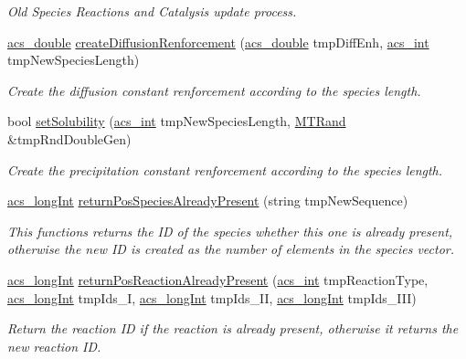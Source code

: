 \begin{DoxyCompactItemize}
\begin{DoxyCompactList}\small\item\em Old Species Reactions and Catalysis update process. \end{DoxyCompactList}\item 
\hyperlink{a00024_ab776853a005fcbf56af0424a2a4dd607}{acs\-\_\-double} \hyperlink{a00011_af795a4d1f04dfbfcbdf321e20e74f9c2}{create\-Diffusion\-Renforcement} (\hyperlink{a00024_ab776853a005fcbf56af0424a2a4dd607}{acs\-\_\-double} tmp\-Diff\-Enh, \hyperlink{a00024_a8d277355641a098190360234e2ebde35}{acs\-\_\-int} tmp\-New\-Species\-Length)
\begin{DoxyCompactList}\small\item\em Create the diffusion constant renforcement according to the species length. \end{DoxyCompactList}\item 
bool \hyperlink{a00011_a496ba50d3a345cd842ce42406946405c}{set\-Solubility} (\hyperlink{a00024_a8d277355641a098190360234e2ebde35}{acs\-\_\-int} tmp\-New\-Species\-Length, \hyperlink{a00016}{M\-T\-Rand} \&tmp\-Rnd\-Double\-Gen)
\begin{DoxyCompactList}\small\item\em Create the precipitation constant renforcement according to the species length. \end{DoxyCompactList}\item 
\hyperlink{a00024_a19319d75f02db4308bc5c0026d98cd85}{acs\-\_\-long\-Int} \hyperlink{a00011_a4e26cc574e20a5afcfbbe5887109c5af}{return\-Pos\-Species\-Already\-Present} (string tmp\-New\-Sequence)
\begin{DoxyCompactList}\small\item\em This functions returns the I\-D of the species whether this one is already present, otherwise the new I\-D is created as the number of elements in the species vector. \end{DoxyCompactList}\item 
\hyperlink{a00024_a19319d75f02db4308bc5c0026d98cd85}{acs\-\_\-long\-Int} \hyperlink{a00011_a6feec5685b519ba0cdae0e5c59dffff0}{return\-Pos\-Reaction\-Already\-Present} (\hyperlink{a00024_a8d277355641a098190360234e2ebde35}{acs\-\_\-int} tmp\-Reaction\-Type, \hyperlink{a00024_a19319d75f02db4308bc5c0026d98cd85}{acs\-\_\-long\-Int} tmp\-Ids\-\_\-\-I, \hyperlink{a00024_a19319d75f02db4308bc5c0026d98cd85}{acs\-\_\-long\-Int} tmp\-Ids\-\_\-\-I\-I, \hyperlink{a00024_a19319d75f02db4308bc5c0026d98cd85}{acs\-\_\-long\-Int} tmp\-Ids\-\_\-\-I\-I\-I)
\begin{DoxyCompactList}\small\item\em Return the reaction I\-D if the reaction is already present, otherwise it returns the new reaction I\-D. \end{DoxyCompactList}\item 

\end{DoxyCompactItemize}
